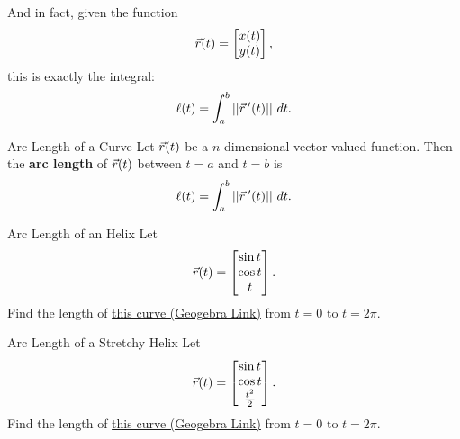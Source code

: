 And in fact, given the function $$\vec{r}(t)=\begin{bmatrix}x(t)\\y(t)\end{bmatrix}, $$ this is exactly the integral:
$$\ell(t)=\int_{a}^{b} ||\vec{r}\hspace{0.2em}'(t)|| \ dt. $$

\begin{definition}{Arc Length of a Curve}
Let $\vec{r}(t)$ be a $n$-dimensional vector valued function. Then the \textbf{arc length} of $\vec{r}(t)$ between $t=a$ and $t=b$ is $$\ell(t)=\int_{a}^{b} ||\vec{r}\hspace{0.2em}'(t)|| \ dt. $$
\end{definition}

\begin{exercise}{Arc Length of an Helix}
Let $$\vec{r}(t)=\begin{bmatrix}\sin t\\ \cos t\\ t\end{bmatrix}.$$ Find the length of \href{https://www.geogebra.org/3d/a3g6kayf}{this curve (Geogebra Link)} from $t=0$ to $t=2\pi$.
\end{exercise}

\begin{exercise}{Arc Length of a Stretchy Helix}
Let $$\vec{r}(t)=\begin{bmatrix}\sin t\\ \cos t\\ \frac{t^2}{2}\end{bmatrix}.$$ Find the length of \href{https://www.geogebra.org/3d/e34aasz5}{this curve (Geogebra Link)} from $t=0$ to $t=2\pi$.
\end{exercise}
